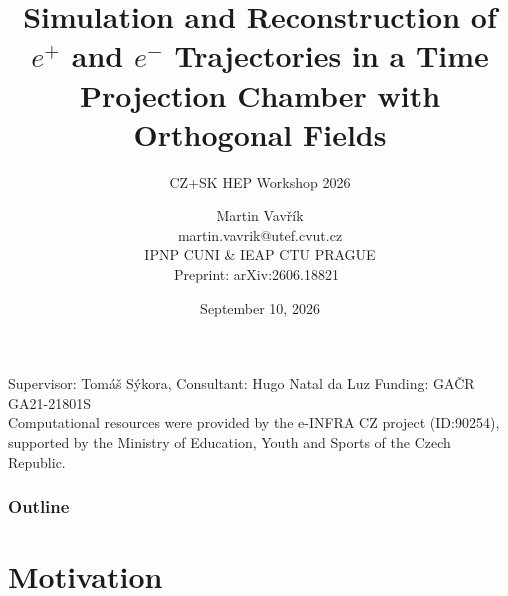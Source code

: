 \documentclass{beamer}
\title[OFTPC track simulation \& reconstruction]{Simulation and Reconstruction of $e^+$ and $e^-$ Trajectories in a Time Projection Chamber with Orthogonal Fields}
\subtitle{CZ+SK HEP Workshop 2026}
\author[M.~Vavřík]{\foreignlanguage{czech}{Martin Vavřík}\vspace{0.2cm}\\martin.vavrik@utef.cvut.cz\\IPNP CUNI \& IEAP CTU PRAGUE\\[0.2cm]
	\footnotesize Preprint: arXiv:2606.18821~\cite{vavřík2026}\vspace{-0.7cm}}
\date{September 10, 2026}
\begin{document}
	
	\begin{frame}
		\titlepage
		\vspace{-0.9cm}
		\flushleft\scriptsize{Supervisor: Tomáš Sýkora, Consultant: Hugo Natal da Luz}\vspace{-0.15cm}
		\flushleft\scriptsize{Funding: GAČR GA21-21801S\\}
		\tiny{Computational resources were provided by the e-INFRA CZ project (ID:90254),\\ supported by the Ministry of Education, Youth and Sports of the Czech Republic.}
	\end{frame}
	
	\begin{frame}
		\frametitle{Outline}
		\tableofcontents
	\end{frame}
	
	\section{Motivation}
\end{document}
